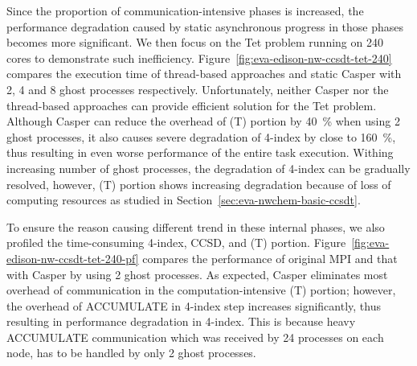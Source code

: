 Since the proportion of communication-intensive phases is increased,
the performance degradation caused by static asynchronous progress in
those phases becomes more significant. We then focus on the Tet problem
running on 240 cores to demonstrate such inefficiency.
Figure~\ref{fig:eva-edison-nw-ccsdt-tet-240} compares the execution time
of thread-based approaches and static Casper with 2, 4 and 8 ghost processes
respectively. Unfortunately, neither Casper nor the thread-based approaches
can provide efficient solution for the Tet problem.
Although Casper can reduce the overhead of (T) portion by 40~\% when using
2 ghost processes, it also causes severe degradation of 4-index by close
to 160~\%, thus resulting in even worse performance of the entire task
execution. Withing increasing number of ghost processes, the degradation
of 4-index can be gradually resolved, however, (T) portion shows increasing
degradation because of loss of computing resources as studied in
Section~\ref{sec:eva-nwchem-basic-ccsdt}.

To ensure the reason causing different trend in these internal
phases, we also profiled the time-consuming 4-index, CCSD, and (T)
portion. Figure~\ref{fig:eva-edison-nw-ccsdt-tet-240-pf}
compares the performance of original MPI and that with Casper by using
2 ghost processes. As expected, Casper eliminates most overhead of
communication in the computation-intensive (T) portion; however,
the overhead of ACCUMULATE in 4-index step increases significantly,
thus resulting in performance degradation in 4-index. This is because
heavy ACCUMULATE communication which was received by 24 processes on
each node, has to be handled by only 2 ghost processes.
